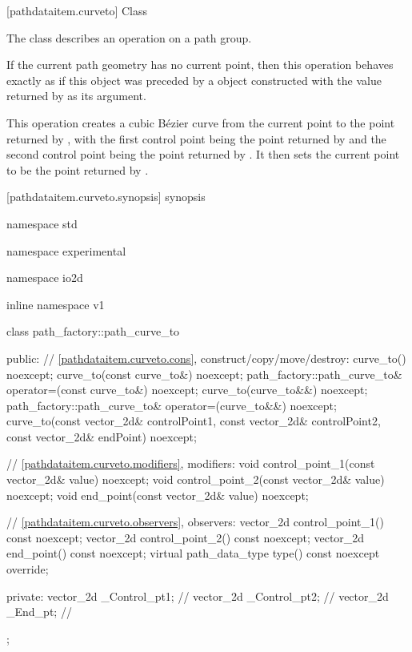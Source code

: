  [pathdataitem.curveto] {Class }

\pnum
{}
The class  describes an operation on a path group.

\pnum
If the current path geometry has no current point, then this operation behaves exactly as if this object was preceded by a  object constructed with the value returned by  as its argument.

\pnum
This operation creates a cubic B\'ezier curve from the current point to the point returned by , with the first control point being the point returned by  and the second control point being the point returned by . It then sets the current point to be the point returned by .

 [pathdataitem.curveto.synopsis] { synopsis}

\begin{codeblock}
namespace std { namespace experimental { namespace io2d { inline namespace v1 {
  class path_factory::path_curve_to {
  public:
    // \ref{pathdataitem.curveto.cons}, construct/copy/move/destroy:
    curve_to() noexcept;
    curve_to(const curve_to&) noexcept;
    path_factory::path_curve_to& operator=(const curve_to&) noexcept;
    curve_to(curve_to&&) noexcept;
    path_factory::path_curve_to& operator=(curve_to&&) noexcept;
    curve_to(const vector_2d& controlPoint1, const vector_2d& controlPoint2,
      const vector_2d& endPoint) noexcept;

    // \ref{pathdataitem.curveto.modifiers}, modifiers:
    void control_point_1(const vector_2d& value) noexcept;
    void control_point_2(const vector_2d& value) noexcept;
    void end_point(const vector_2d& value) noexcept;


    // \ref{pathdataitem.curveto.observers}, observers:
    vector_2d control_point_1() const noexcept;
    vector_2d control_point_2() const noexcept;
    vector_2d end_point() const noexcept;
    virtual path_data_type type() const noexcept override;
    
  private:
    vector_2d _Control_pt1; // \expos
    vector_2d _Control_pt2; // \expos
    vector_2d _End_pt;      // \expos
  };
} } } }
\end{codeblock}

